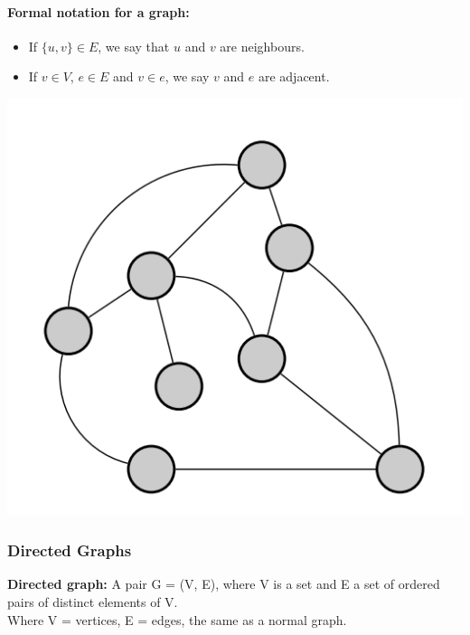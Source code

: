 \documentclass[11pt]{article}
\begin{document}
\paragraph{Formal notation for a graph:}
\begin{itemize}
    \item If $\{u, v\} \in E$, we say that $u$ and $v$ are neighbours.
    \item If $v \in V$, $e \in E$ and $v \in e$, we say $v$ and $e$ are adjacent.
\end{itemize}
\begin{center}
    \includegraphics{img/graph.png}
\end{center}
\newpage
\subsubsection{Directed Graphs}
\noindent\textbf{Directed graph:} A pair G = (V, E), where V is a set and E
a set of ordered pairs of distinct elements of V.\\ \hspace*{36mm} Where V = vertices, E = edges, the same as a normal graph.
\end{document}
